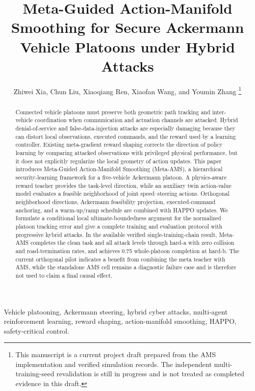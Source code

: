 \documentclass[lettersize,journal]{IEEEtran}
\begin{document}
\title{Meta-Guided Action-Manifold Smoothing for Secure Ackermann Vehicle Platoons under Hybrid Attacks}

\author{Zhiwei Xia, Chun Liu, Xiaoqiang Ren, Xiaofan Wang, and Youmin Zhang%
\thanks{This manuscript is a current project draft prepared from the AMS implementation and verified simulation records. The independent multi-training-seed revalidation is still in progress and is not treated as completed evidence in this draft.}}

\maketitle

\begin{abstract}
Connected vehicle platoons must preserve both geometric path tracking and inter-vehicle coordination when communication and actuation channels are attacked. Hybrid denial-of-service and false-data-injection attacks are especially damaging because they can distort local observations, executed commands, and the reward used by a learning controller. Existing meta-gradient reward shaping corrects the direction of policy learning by comparing attacked observations with privileged physical performance, but it does not explicitly regularize the local geometry of action updates. This paper introduces Meta-Guided Action-Manifold Smoothing (Meta-AMS), a hierarchical security-learning framework for a five-vehicle Ackermann platoon. A physics-aware reward teacher provides the task-level direction, while an auxiliary twin action-value model evaluates a feasible neighborhood of joint speed--steering actions. Orthogonal neighborhood directions, Ackermann feasibility projection, executed-command anchoring, and a warm-up/ramp schedule are combined with HAPPO updates. We formulate a conditional local ultimate-boundedness argument for the normalized platoon tracking error and give a complete training and evaluation protocol with progressive hybrid attacks. In the available verified single-training-chain result, Meta-AMS completes the clean task and all attack levels through hard-a with zero collision and road-termination rates, and achieves 0.75 whole-platoon completion at hard-b. The current orthogonal pilot indicates a benefit from combining the meta teacher with AMS, while the standalone AMS cell remains a diagnostic failure case and is therefore not used to claim a final causal effect.
\end{abstract}

\begin{IEEEkeywords}
Vehicle platooning, Ackermann steering, hybrid cyber attacks, multi-agent reinforcement learning, reward shaping, action-manifold smoothing, HAPPO, safety-critical control.
\end{IEEEkeywords}
\end{document}
